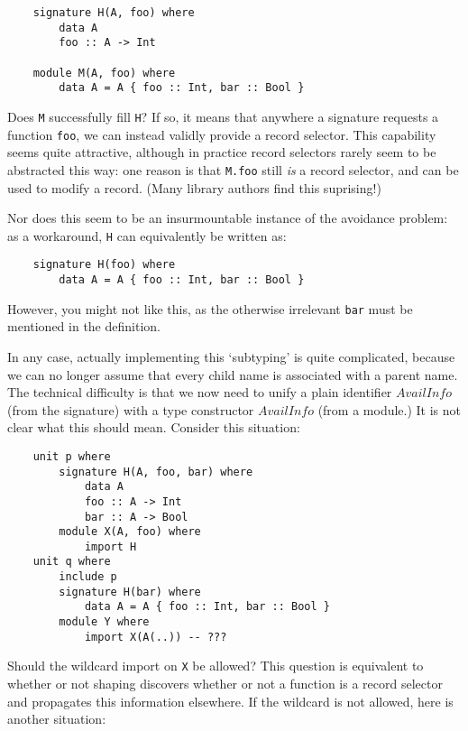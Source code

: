 \documentclass{article}
\newcommand{\I}[1]{\ensuremath{\mathit{#1}}}
\begin{document}
\begin{verbatim}
    signature H(A, foo) where
        data A
        foo :: A -> Int

    module M(A, foo) where
        data A = A { foo :: Int, bar :: Bool }
\end{verbatim}
%
Does \verb|M| successfully fill \verb|H|?  If so, it means that anywhere
a signature requests a function \verb|foo|, we can instead validly
provide a record selector.  This capability seems quite attractive,
although in practice record selectors rarely seem to be abstracted this
way: one reason is that \verb|M.foo| still \emph{is} a record selector,
and can be used to modify a record.  (Many library authors find this
suprising!)

Nor does this seem to be an insurmountable instance of the avoidance
problem:
as a workaround, \verb|H| can equivalently be written as:

\begin{verbatim}
    signature H(foo) where
        data A = A { foo :: Int, bar :: Bool }
\end{verbatim}
%
However, you might not like this, as the otherwise irrelevant \verb|bar| must be mentioned
in the definition.

In any case, actually implementing this `subtyping' is quite complicated, because we can no
longer assume that every child name is associated with a parent name.
The technical difficulty is that we now need to unify a plain identifier
\I{AvailInfo} (from the signature) with a type constructor \I{AvailInfo}
(from a module.)  It is not clear what this should mean.
Consider this situation:

\begin{verbatim}
    unit p where
        signature H(A, foo, bar) where
            data A
            foo :: A -> Int
            bar :: A -> Bool
        module X(A, foo) where
            import H
    unit q where
        include p
        signature H(bar) where
            data A = A { foo :: Int, bar :: Bool }
        module Y where
            import X(A(..)) -- ???
\end{verbatim}

Should the wildcard import on \verb|X| be allowed?
This question is equivalent to whether or not shaping discovers
whether or not a function is a record selector and propagates this
information elsewhere.
If the wildcard is not allowed, here is another situation:
\end{document}
